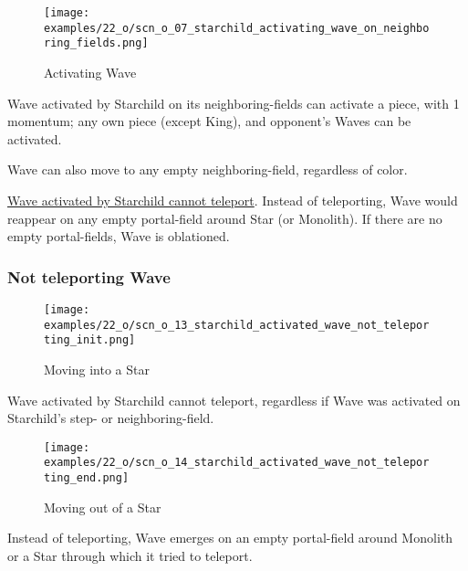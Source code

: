 \noindent
\begin{wrapfigure}[8]{l}{0.4\textwidth}
\centering
\texttt{[image: examples/22\_o/scn\_o\_07\_starchild\_activating\_wave\_on\_neighboring\_fields.png]}
\caption{Activating Wave}
\label{fig:scn_o_07_starchild_activating_wave_on_neighboring_fields}
\end{wrapfigure}
Wave activated by Starchild on its neighboring-fields can activate a piece, with 1 momentum;
any own piece (except King), and opponent's Waves can be activated.

Wave can also move to any empty neighboring-field, regardless of color.

\hyperref[fig:scn_o_13_starchild_activated_wave_not_teleporting_init]{Wave activated by Starchild cannot teleport}.
Instead of teleporting, Wave would reappear on any empty portal-field around Star (or Monolith).
If there are no empty portal-fields, Wave is oblationed.

\clearpage %

\subsubsection*{Not teleporting Wave}

\noindent
\begin{wrapfigure}[4]{l}{0.4\textwidth}
\centering
\texttt{[image: examples/22\_o/scn\_o\_13\_starchild\_activated\_wave\_not\_teleporting\_init.png]}
\caption{Moving into a Star}
\label{fig:scn_o_13_starchild_activated_wave_not_teleporting_init}
\end{wrapfigure}
Wave activated by Starchild cannot teleport, regardless if Wave was activated on Starchild's
step- or neighboring-field.

\vspace*{7.1\baselineskip}
\noindent
\begin{wrapfigure}[7]{l}{0.4\textwidth}
\centering
\texttt{[image: examples/22\_o/scn\_o\_14\_starchild\_activated\_wave\_not\_teleporting\_end.png]}
\caption{Moving out of a Star}
\label{fig:scn_o_14_starchild_activated_wave_not_teleporting_end}
\end{wrapfigure}
Instead of teleporting, Wave emerges on an empty portal-field around Monolith or a Star through
which it tried to teleport.

